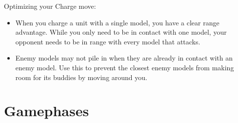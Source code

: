 Optimizing your Charge move:
\begin{itemize}
    \item When you charge a unit with a single model, you have a clear range
        advantage. While you only need to be in contact with one model, your
        opponent needs to be in range with every model that attacks.
    \item Enemy models may not pile in when they are already in contact with an
        enemy model. Use this to prevent the closest enemy models from making
        room for its buddies by moving around you.
\end{itemize}

\newpage
\section{Gamephases}
